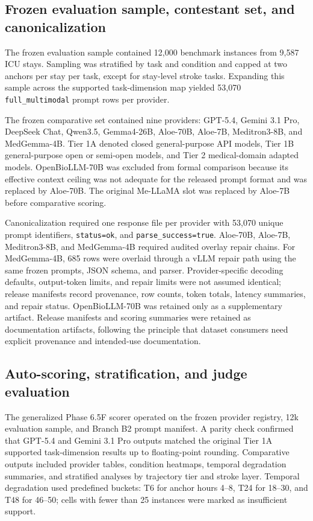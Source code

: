 \documentclass[pdflatex,sn-nature]{sn-jnl}
\begin{document}
\subsection{Frozen evaluation sample, contestant set, and canonicalization}

The frozen evaluation sample contained 12,000 benchmark instances from 9,587 ICU stays. Sampling was stratified by task and condition and capped at two anchors per stay per task, except for stay-level stroke tasks. Expanding this sample across the supported task-dimension map yielded 53,070 \texttt{full\_multimodal} prompt rows per provider.

The frozen comparative set contained nine providers: GPT-5.4, Gemini 3.1 Pro, DeepSeek Chat, Qwen3.5, Gemma4-26B, Aloe-70B, Aloe-7B, Meditron3-8B, and MedGemma-4B. Tier 1A denoted closed general-purpose API models, Tier 1B general-purpose open or semi-open models, and Tier 2 medical-domain adapted models. OpenBioLLM-70B was excluded from formal comparison because its effective context ceiling was not adequate for the released prompt format and was replaced by Aloe-70B. The original Me-LLaMA slot was replaced by Aloe-7B before comparative scoring.

Canonicalization required one response file per provider with 53,070 unique prompt identifiers, \texttt{status=ok}, and \texttt{parse\_success=true}. Aloe-70B, Aloe-7B, Meditron3-8B, and MedGemma-4B required audited overlay repair chains. For MedGemma-4B, 685 rows were overlaid through a vLLM repair path using the same frozen prompts, JSON schema, and parser. Provider-specific decoding defaults, output-token limits, and repair limits were not assumed identical; release manifests record provenance, row counts, token totals, latency summaries, and repair status. OpenBioLLM-70B was retained only as a supplementary artifact. Release manifests and scoring summaries were retained as documentation artifacts, following the principle that dataset consumers need explicit provenance and intended-use documentation\cite{gebru2021datasheets}.

\subsection{Auto-scoring, stratification, and judge evaluation}

The generalized Phase 6.5F scorer operated on the frozen provider registry, 12k evaluation sample, and Branch B2 prompt manifest. A parity check confirmed that GPT-5.4 and Gemini 3.1 Pro outputs matched the original Tier 1A supported task-dimension results up to floating-point rounding. Comparative outputs included provider tables, condition heatmaps, temporal degradation summaries, and stratified analyses by trajectory tier and stroke layer. Temporal degradation used predefined buckets: T6 for anchor hours 4--8, T24 for 18--30, and T48 for 46--50; cells with fewer than 25 instances were marked as insufficient support.
\end{document}
